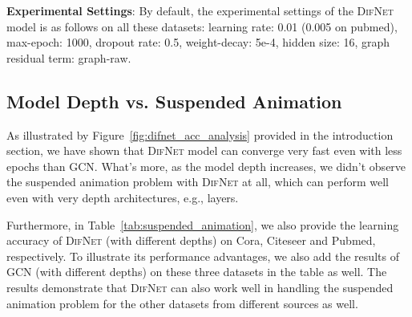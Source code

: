 \documentclass{article}
\newcommand{\our}{\textsc{DifNet}}
\newcommand{\gcn}{\textsc{GCN}}
\begin{document}
\noindent \textbf{Experimental Settings}: By default, the experimental settings of the {\our} model is as follows on all these datasets: learning rate: 0.01 (0.005 on pubmed), max-epoch: 1000, dropout rate: 0.5, weight-decay: 5e{-4}, hidden size: 16, graph residual term: graph-raw.

\subsection{Model Depth vs. Suspended Animation}
 
As illustrated by Figure~\ref{fig:difnet_acc_analysis} provided in the introduction section, we have shown that {\our} model can converge very fast even with less epochs than {\gcn}. What's more, as the model depth increases, we didn't observe the suspended animation problem with {\our} at all, which can perform well even with very depth architectures, e.g.,  layers.

Furthermore, in Table~\ref{tab:suspended_animation}, we also provide the learning accuracy of {\our} (with different depths) on Cora, Citeseer and Pubmed, respectively. To illustrate its performance advantages, we also add the results of {\gcn} (with different depths) on these three datasets in the table as well. The results demonstrate that {\our} can also work well in handling the suspended animation problem for the other datasets from different sources as well.
\end{document}
